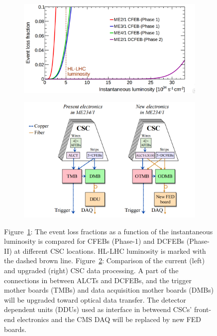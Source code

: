 	\begin{figure}[H]
		\begin{subfigure}{\linewidth}
			\centering
			\includegraphics[width=\plotwidth]{fig/chapt3/CSC-event-loss.png}\\
			\caption{\label{fig:CSC-upgrade:A}}
		\end{subfigure}
		\begin{subfigure}{\linewidth}
			\centering
			\includegraphics[width=\plotwidth]{fig/chapt3/CSC-upgrade.png}
			\caption{\label{fig:CSC-upgrade:B}}
		\end{subfigure}
		\caption{\label{fig:CSC-upgrade} Figure~\ref{fig:CSC-upgrade:A}: The event loss fractions as a function of the instantaneous luminosity is compared for CFEBs (Phase-1) and DCFEBs (Phase-II) at different CSC locations. HL-LHC luminosity is marked with the dashed brown line. Figure~\ref{fig:CSC-upgrade:B}: Comparison of the current (left) and upgraded (right) CSC data processing. A part of the connections in between ALCTs and DCFEBs, and the trigger mother boards (TMBs) and data acquisition mother boards (DMBs) will be upgraded toward optical data transfer. The detector dependent units (DDUs) used as interface in betweend CSCs' front-end electronics and the CMS DAQ will be replaced by new FED boards.}
	\end{figure}
	
